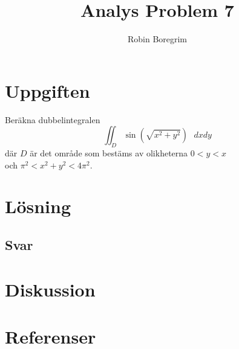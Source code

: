 \documentclass[11pt]{article}
\begin{document}
\title{Analys Problem 7}
\author{Robin Boregrim}
\maketitle
\renewcommand{\contentsname}{Innehållsförteckning}
\tableofcontents
\newpage
\section{Uppgiften}
Beräkna dubbelintegralen $$\iint_D \sin(\sqrt{x^2 + y^2})\textbf{ } dxdy$$
där $D$ är det område som bestäms av olikheterna $0<y<x$ \\
och $\pi^2 < x^2 + y^2 < 4\pi^2$.
\section{Lösning}
\subsection{Svar}
\section{Diskussion}
\section{Referenser}
\end{document}
